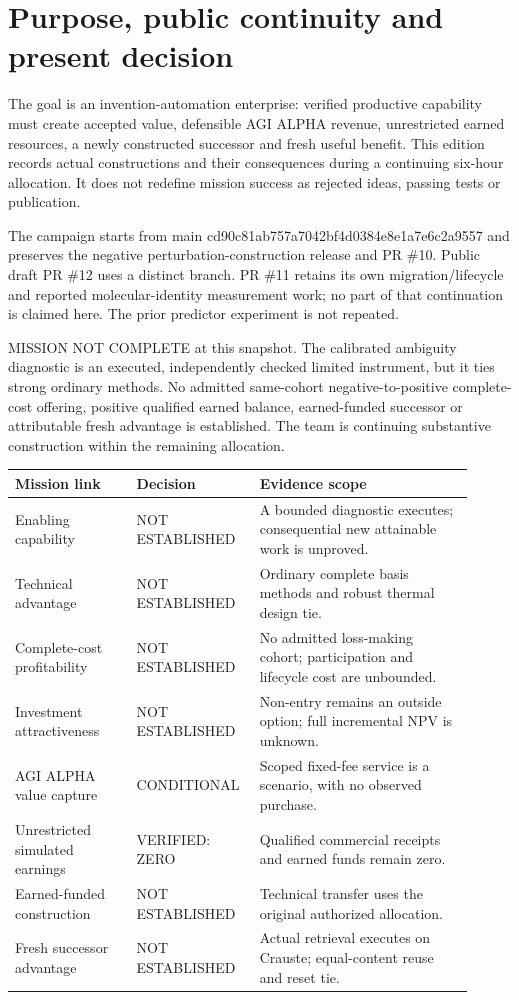 \documentclass[11pt,letterpaper]{article}
\begin{document}
\section{Purpose, public continuity and present decision}
The goal is an invention-automation enterprise: verified productive capability must create accepted value, defensible AGI ALPHA revenue, unrestricted earned resources, a newly constructed successor and fresh useful benefit. This edition records actual constructions and their consequences during a continuing six-hour allocation. It does not redefine mission success as rejected ideas, passing tests or publication.\par
The campaign starts from main cd90c81ab757a7042bf4d0384e8e1a7e6c2a9557 and preserves the negative perturbation-construction release and PR \#10. Public draft PR \#12 uses a distinct branch. PR \#11 retains its own migration/lifecycle and reported molecular-identity measurement work; no part of that continuation is claimed here. The prior predictor experiment is not repeated.\par
MISSION NOT COMPLETE at this snapshot. The calibrated ambiguity diagnostic is an executed, independently checked limited instrument, but it ties strong ordinary methods. No admitted same-cohort negative-to-positive complete-cost offering, positive qualified earned balance, earned-funded successor or attributable fresh advantage is established. The team is continuing substantive construction within the remaining allocation.\par
\begingroup\small\begin{longtable}{>{\raggedright\arraybackslash}p{0.25\linewidth}>{\raggedright\arraybackslash}p{0.22\linewidth}>{\raggedright\arraybackslash}p{0.44\linewidth}}\toprule
\textbf{Mission link} & \textbf{Decision} & \textbf{Evidence scope}\\\midrule\endhead
Enabling capability & NOT ESTABLISHED & A bounded diagnostic executes; consequential new attainable work is unproved.\\
Technical advantage & NOT ESTABLISHED & Ordinary complete basis methods and robust thermal design tie.\\
Complete-cost profitability & NOT ESTABLISHED & No admitted loss-making cohort; participation and lifecycle cost are unbounded.\\
Investment attractiveness & NOT ESTABLISHED & Non-entry remains an outside option; full incremental NPV is unknown.\\
AGI ALPHA value capture & CONDITIONAL & Scoped fixed-fee service is a scenario, with no observed purchase.\\
Unrestricted simulated earnings & VERIFIED: ZERO & Qualified commercial receipts and earned funds remain zero.\\
Earned-funded construction & NOT ESTABLISHED & Technical transfer uses the original authorized allocation.\\
Fresh successor advantage & NOT ESTABLISHED & Actual retrieval executes on Crauste; equal-content reuse and reset tie.\\
\bottomrule\end{longtable}\endgroup
\end{document}
